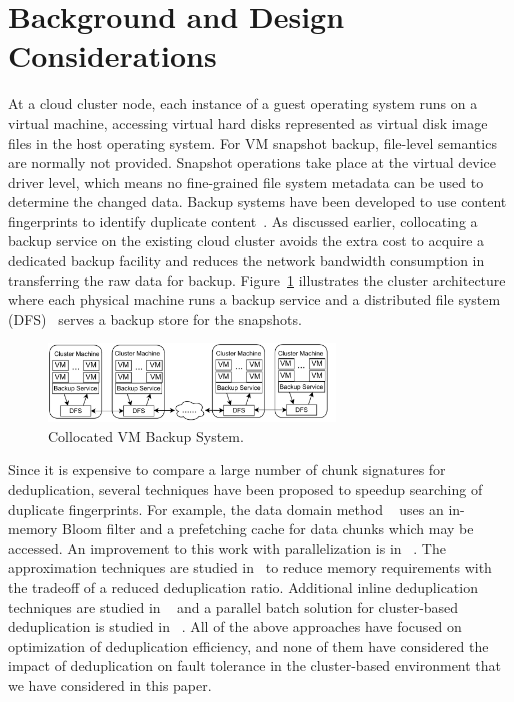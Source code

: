 \section{Background and Design Considerations}
\label{sect:background}
At a cloud cluster node, each instance of a guest operating system runs on a virtual machine, accessing virtual hard disks 
represented as virtual disk image files in the host operating system.
For VM snapshot backup, file-level semantics are normally not provided.
Snapshot operations take place at the virtual device driver level, which
means no fine-grained file system metadata can be used to determine the changed data. 
Backup systems have been developed to use content fingerprints to identify duplicate
content~\cite{venti02,Rhea2008}.  
As discussed earlier, collocating a backup service on the existing
cloud cluster avoids the extra cost to acquire a dedicated backup facility
and reduces the network bandwidth consumption in transferring the
raw data for backup. 
Figure~\ref{fig:collocated} illustrates the cluster architecture where
each physical machine runs a backup service and a distributed file system (DFS)~\cite{googlefs03,hdfs10} 
serves a backup store  for the snapshots.

\begin{figure}[htb]
    \centering
    \includegraphics[width=3in]{images/colocated-arch}
    \caption{Collocated VM Backup System.}
    \label{fig:collocated}
\end{figure}

Since it is expensive to compare a large number of chunk signatures for deduplication,
several techniques have been proposed to speedup searching of duplicate
fingerprints. For example, the data domain method ~\cite{bottleneck08} 
uses  an in-memory Bloom filter and a prefetching cache for data chunks  which may be
accessed.  An improvement to this work with parallelization is in ~\cite{MAD210,DEBAR}.
The approximation techniques are studied in~\cite{extreme_binning09,Guo2011,WeiZhangIEEE}  
to reduce memory requirements with the tradeoff of a reduced deduplication ratio.
Additional inline deduplication techniques are studied in ~\cite{sparseindex09,Guo2011,idedup}
and a parallel batch solution for cluster-based deduplication is 
studied in ~\cite{WeiZhangHotStorage13}. 
All of the above approaches have focused on optimization of deduplication
efficiency, and none of them have considered the impact
of deduplication on fault tolerance in the cluster-based environment that we have considered
in this paper.

